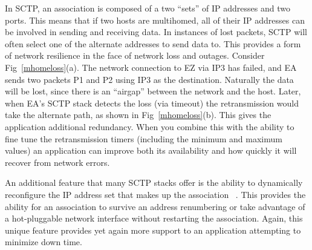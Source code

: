 \documentclass[conference]{IEEEtran}
\begin{document}
In SCTP, an association is composed of a two ``sets'' of IP addresses and two ports. This
means that if two hosts are multihomed, all of their IP addresses can be involved
in sending and receiving data. In instances of lost packets, SCTP will often select
one of the alternate addresses to send data to. This provides a form of network 
resilience in the face of network loss and outages. Consider Fig~\ref{mhomeloss}(a).
The network connection to EZ via IP3 has failed, and EA sends two packets P1 and P2 using
IP3 as the destination. Naturally the data will be lost, since there is an ``airgap''
between the network and the host. Later, when EA's SCTP stack detects the loss (via timeout)
the retransmission would take the alternate path, as shown in Fig~\ref{mhomeloss}(b). This gives
the application additional redundancy. When you combine this with the ability to fine tune
the retransmission timers (including the minimum and maximum values) an 
application can improve both its availability and how quickly it will recover from
network errors.

An additional feature that many SCTP stacks offer is the ability to dynamically 
reconfigure the IP address set that makes up the association ~\cite{rfc5061}. This
provides the ability for an association to survive an address renumbering or take
advantage of a hot-pluggable network interface without restarting the 
association. Again, this unique feature provides yet again more support 
to an application attempting to minimize down time.
\end{document}
